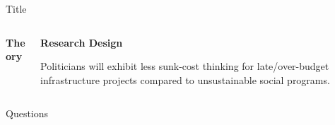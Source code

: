 \begin{frame}{Title}

\begin{columns}
  \begin{column}[T]{0.5\textwidth}
    \textbf{Theory}

    
  \end{column}

  \begin{column}[T]{0.5\textwidth}

    \textbf{Research Design}

    Politicians will exhibit less sunk-cost thinking for late/over-budget infrastructure projects compared to unsustainable social programs.




    \vspace{0.2cm}
  \end{column}
\end{columns}


\end{frame}

\begin{frame}{Questions}
  
\end{frame}
